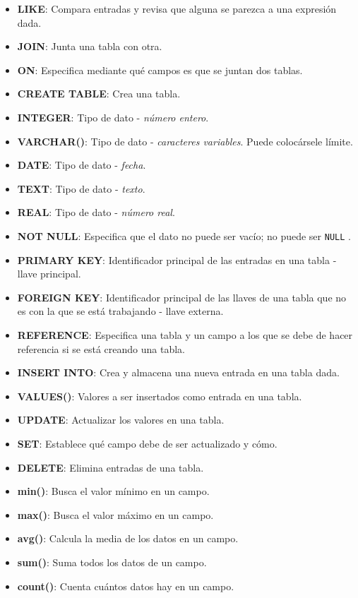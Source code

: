 \documentclass[10pt,letterpaper]{article}
\newcommand{\inlinecode}[1]{
\colorbox{light-gray}{\texttt{#1}}
}
\begin{document}
\begin{small}
\begin{itemize}
\item \textbf{LIKE}: Compara entradas y revisa que alguna se parezca a una expresi\'on dada.
\item \textbf{JOIN}: Junta una tabla con otra.
\item \textbf{ON}: Especifica mediante qu\'e campos es que se juntan dos tablas.
\item \textbf{CREATE TABLE}: Crea una tabla.
\item \textbf{INTEGER}: Tipo de dato - \emph{n\'umero entero}.
\item \textbf{VARCHAR()}: Tipo de dato - \emph{caracteres variables}. Puede coloc\'arsele l\'imite.
\item \textbf{DATE}: Tipo de dato - \emph{fecha}.
\item \textbf{TEXT}: Tipo de dato - \emph{texto}.
\item \textbf{REAL}: Tipo de dato - \emph{n\'umero real}.
\item \textbf{NOT NULL}: Especifica que el dato no puede ser vac\'io; no puede ser \inlinecode{NULL}.
\item \textbf{PRIMARY KEY}: Identificador principal de las entradas en una tabla - llave principal.
\item \textbf{FOREIGN KEY}: Identificador principal de las llaves de una tabla que no es con la que se est\'a trabajando - llave externa.
\item \textbf{REFERENCE}: Especifica una tabla y un campo a los que se debe de hacer referencia si se est\'a creando una tabla.
\item \textbf{INSERT INTO}: Crea y almacena una nueva entrada en una tabla dada.
\item \textbf{VALUES()}: Valores a ser insertados como entrada en una tabla.
\item \textbf{UPDATE}: Actualizar los valores en una tabla.
\item \textbf{SET}: Establece qu\'e campo debe de ser actualizado y c\'omo.
\item \textbf{DELETE}: Elimina entradas de una tabla.
\item \textbf{min()}: Busca el valor m\'inimo en un campo.
\item \textbf{max()}: Busca el valor m\'aximo en un campo.
\item \textbf{avg()}: Calcula la media de los datos en un campo.
\item \textbf{sum()}: Suma todos los datos de un campo.
\item \textbf{count()}: Cuenta cu\'antos datos hay en un campo.
\end{itemize}
\end{small}
\end{document}
